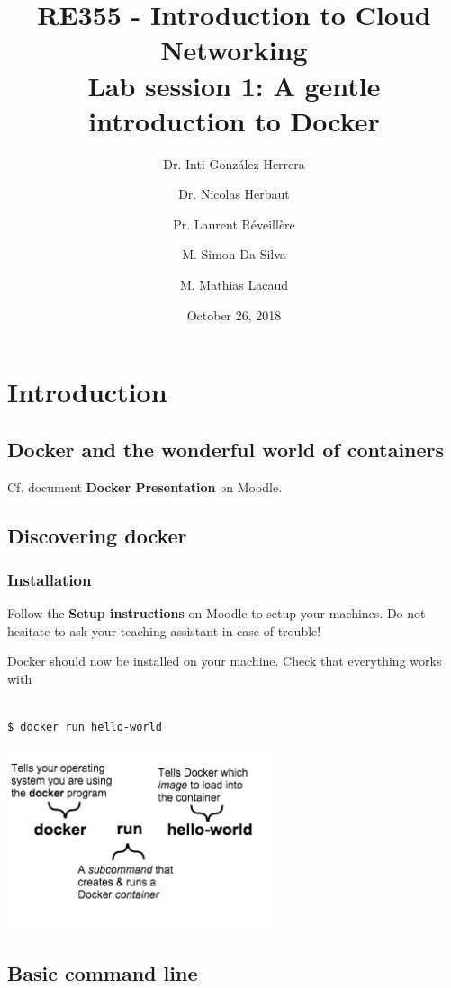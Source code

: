\documentclass[a4paper,11pt]{exam}
\date{October 26, 2018}%
\title{RE355 - Introduction to Cloud Networking \\
Lab session 1: A gentle introduction to Docker}
\author{Dr. Inti González Herrera \and Dr. Nicolas Herbaut \and Pr. Laurent Réveillère \and M. Simon Da Silva \and M. Mathias Lacaud}
\begin{document}
		
\maketitle

\section{Introduction}

\subsection{Docker and the wonderful world of containers}

Cf. document \textbf{Docker Presentation} on Moodle.

\subsection{Discovering docker}

\subsubsection{Installation}

Follow the \textbf{Setup instructions} on Moodle to setup your machines.
Do not hesitate to ask your teaching assistant in case of trouble!

Docker should now be installed on your machine. Check that everything works with

\begin{lstlisting}[frame=single,language={sh}]  % Start your code-block

$ docker run hello-world
\end{lstlisting}
\begin{center}
\includegraphics[width=8cm]{container_explainer.png}	
\end{center}


\subsection{Basic command line} \label{sssec:commandline}
\end{document}
